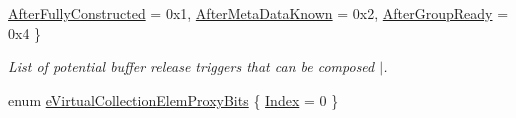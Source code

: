 \begin{DoxyCompactItemize}
\hyperlink{namespacevt_1_1vrt_1_1collection_a2545006e681bacc1f00be9d5d6bdc8faa0f7a17004b32392e5c7e8da3020f3c62}{After\+Fully\+Constructed} = 0x1, 
\hyperlink{namespacevt_1_1vrt_1_1collection_a2545006e681bacc1f00be9d5d6bdc8faaac942bb8dfdc5b8917b317e697ffc97b}{After\+Meta\+Data\+Known} = 0x2, 
\hyperlink{namespacevt_1_1vrt_1_1collection_a2545006e681bacc1f00be9d5d6bdc8faa3f87b3703c1c4e5afe8d9e3a891c82d4}{After\+Group\+Ready} = 0x4
 \}\begin{DoxyCompactList}\small\item\em List of potential buffer release triggers that can be composed $\vert$. \end{DoxyCompactList}
\item 
enum \hyperlink{namespacevt_1_1vrt_1_1collection_a216d0b183a155808303b12c258f259a0}{e\+Virtual\+Collection\+Elem\+Proxy\+Bits} \{ \hyperlink{namespacevt_1_1vrt_1_1collection_a216d0b183a155808303b12c258f259a0a0af778d966820c09e81e6d33599fa217}{Index} = 0
 \}
\end{DoxyCompactItemize}
